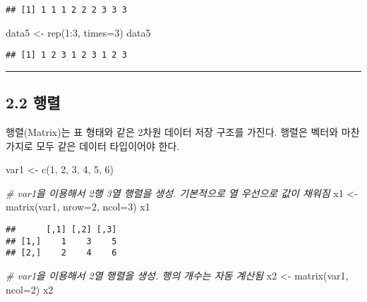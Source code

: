 \documentclass[
]{article}
\newenvironment{Shaded}{\begin{snugshade}}{\end{snugshade}}
\newcommand{\AttributeTok}[1]{\textcolor[rgb]{0.77,0.63,0.00}{#1}}
\newcommand{\CommentTok}[1]{\textcolor[rgb]{0.56,0.35,0.01}{\textit{#1}}}
\newcommand{\DecValTok}[1]{\textcolor[rgb]{0.00,0.00,0.81}{#1}}
\newcommand{\FunctionTok}[1]{\textcolor[rgb]{0.00,0.00,0.00}{#1}}
\newcommand{\NormalTok}[1]{#1}
\newcommand{\OtherTok}[1]{\textcolor[rgb]{0.56,0.35,0.01}{#1}}
\newcommand{\SpecialCharTok}[1]{\textcolor[rgb]{0.00,0.00,0.00}{#1}}
\begin{document}
\begin{verbatim}
## [1] 1 1 1 2 2 2 3 3 3
\end{verbatim}

\begin{Shaded}
\begin{Highlighting}[]
\NormalTok{data5 }\OtherTok{\textless{}{-}} \FunctionTok{rep}\NormalTok{(}\DecValTok{1}\SpecialCharTok{:}\DecValTok{3}\NormalTok{, }\AttributeTok{times=}\DecValTok{3}\NormalTok{)}
\NormalTok{data5}
\end{Highlighting}
\end{Shaded}

\begin{verbatim}
## [1] 1 2 3 1 2 3 1 2 3
\end{verbatim}

\begin{center}\rule{0.5\linewidth}{0.5pt}\end{center}

\hypertarget{uxd589uxb82c}{%
\subsection{2.2 행렬}\label{uxd589uxb82c}}

행렬(Matrix)는 표 형태와 같은 2차원 데이터 저장 구조를 가진다. 행렬은
벡터와 마찬가지로 모두 같은 데이터 타입이어야 한다.

\begin{Shaded}
\begin{Highlighting}[]
\NormalTok{var1 }\OtherTok{\textless{}{-}} \FunctionTok{c}\NormalTok{(}\DecValTok{1}\NormalTok{, }\DecValTok{2}\NormalTok{, }\DecValTok{3}\NormalTok{, }\DecValTok{4}\NormalTok{, }\DecValTok{5}\NormalTok{, }\DecValTok{6}\NormalTok{)}

\CommentTok{\# var1을 이용해서 2행 3열 행렬을 생성. 기본적으로 열 우선으로 값이 채워짐}
\NormalTok{x1 }\OtherTok{\textless{}{-}} \FunctionTok{matrix}\NormalTok{(var1, }\AttributeTok{nrow=}\DecValTok{2}\NormalTok{, }\AttributeTok{ncol=}\DecValTok{3}\NormalTok{)}
\NormalTok{x1}
\end{Highlighting}
\end{Shaded}

\begin{verbatim}
##      [,1] [,2] [,3]
## [1,]    1    3    5
## [2,]    2    4    6
\end{verbatim}

\begin{Shaded}
\begin{Highlighting}[]
\CommentTok{\# var1을 이용해서 2열 행렬을 생성. 행의 개수는 자동 계산됨}
\NormalTok{x2 }\OtherTok{\textless{}{-}} \FunctionTok{matrix}\NormalTok{(var1, }\AttributeTok{ncol=}\DecValTok{2}\NormalTok{)}
\NormalTok{x2}
\end{Highlighting}
\end{Shaded}
\end{document}
